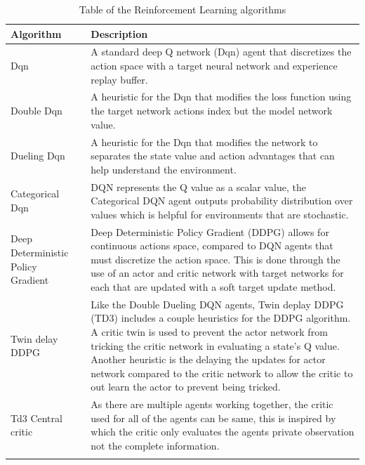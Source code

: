 \begin{longtable}{|p{5cm}|p{10cm}|} \hline
    \textbf{Algorithm} & \textbf{Description} \\ \hline
    Dqn~\citep{mnih2015humanlevel} & A standard deep Q network (Dqn) agent that discretizes the action space with a
        target neural network and experience replay buffer. \\ \hline
    Double Dqn~\citep{doubledqn} & A heuristic for the Dqn that modifies the loss function using the target network
        actions index but the model network value. \\ \hline
    Dueling Dqn~\citep{duelingdqn} & A heuristic for the Dqn that modifies the network to separates the state value
        and action advantages that can help understand the environment. \\ \hline
    Categorical Dqn~\citep{distributional_dqn} & DQN represents the Q value as a scalar value, the Categorical DQN agent
        outputs probability distribution over values which is helpful for environments that are stochastic. \\ \hline
    Deep Deterministic Policy Gradient~\citep{ddpg} & Deep Deterministic Policy Gradient (DDPG) allows for continuous
        actions space, compared to DQN agents that must discretize the action space. This is done through the use of an
        actor and critic network with target networks for each that are updated with a soft target update method. \\ \hline
    Twin delay DDPG~\citep{td3} & Like the Double Dueling DQN agents, Twin deplay DDPG (TD3) includes a couple
        heuristics for the DDPG algorithm. A critic twin is used to prevent the actor network from tricking the critic
        network in evaluating a state's Q value. Another heuristic is the delaying the updates for actor network
        compared to the critic network to allow the critic to out learn the actor to prevent being tricked.\\ \hline
    Td3 Central critic & As there are multiple agents working together, the critic used for all of the agents can be
        same, this is inspired by~\cite{maddpg} which the critic only evaluates the agents private observation not the
        complete information. \\ \hline
    \caption{Table of the Reinforcement Learning algorithms}
    \label{tab:reinforcement_learning_algorithms}
\end{longtable}

